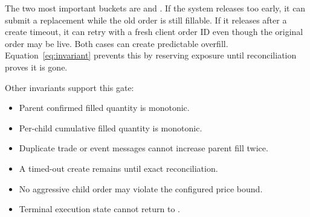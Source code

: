 The two most important buckets are  and . If the system releases  too early, it can submit a replacement while the old order is still fillable. If it releases  after a create timeout, it can retry with a fresh client order ID even though the original order may be live. Both cases can create predictable overfill. Equation~\ref{eq:invariant} prevents this by reserving exposure until reconciliation proves it is gone.

Other invariants support this gate:

\begin{itemize}[leftmargin=1.2em]
  \item Parent confirmed filled quantity is monotonic.
  \item Per-child cumulative filled quantity is monotonic.
  \item Duplicate trade or event messages cannot increase parent fill twice.
  \item A timed-out create remains  until exact  reconciliation.
  \item No aggressive child order may violate the configured price bound.
  \item Terminal execution state cannot return to .
\end{itemize}
